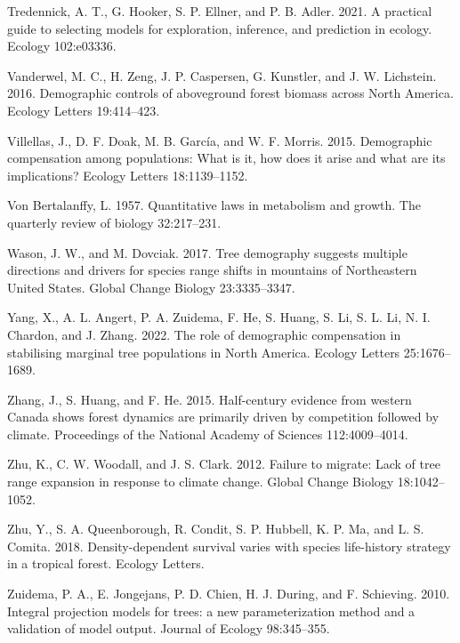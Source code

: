 \documentclass[12pt]{article}
\newlength{\cslhangindent}
\newenvironment{cslreferences}%
  {\setlength{\parindent}{0pt}%
  \everypar{\setlength{\hangindent}{\cslhangindent}}\ignorespaces}%
  {\par}
\begin{document}
\begin{cslreferences}
\leavevmode\hypertarget{ref-Tredennick2021}{}%
Tredennick, A. T., G. Hooker, S. P. Ellner, and P. B. Adler. 2021. A
practical guide to selecting models for exploration, inference, and
prediction in ecology. Ecology 102:e03336.

\leavevmode\hypertarget{ref-Vanderwel2016a}{}%
Vanderwel, M. C., H. Zeng, J. P. Caspersen, G. Kunstler, and J. W.
Lichstein. 2016. Demographic controls of aboveground forest biomass
across North America. Ecology Letters 19:414--423.

\leavevmode\hypertarget{ref-Villellas2015}{}%
Villellas, J., D. F. Doak, M. B. García, and W. F. Morris. 2015.
Demographic compensation among populations: What is it, how does it
arise and what are its implications? Ecology Letters 18:1139--1152.

\leavevmode\hypertarget{ref-von1957quantitative}{}%
Von Bertalanffy, L. 1957. Quantitative laws in metabolism and growth.
The quarterly review of biology 32:217--231.

\leavevmode\hypertarget{ref-Wason2017}{}%
Wason, J. W., and M. Dovciak. 2017. Tree demography suggests multiple
directions and drivers for species range shifts in mountains of
Northeastern United States. Global Change Biology 23:3335--3347.

\leavevmode\hypertarget{ref-Yang2022}{}%
Yang, X., A. L. Angert, P. A. Zuidema, F. He, S. Huang, S. Li, S. L. Li,
N. I. Chardon, and J. Zhang. 2022. The role of demographic compensation
in stabilising marginal tree populations in North America. Ecology
Letters 25:1676--1689.

\leavevmode\hypertarget{ref-Zhang2015}{}%
Zhang, J., S. Huang, and F. He. 2015. Half-century evidence from western
Canada shows forest dynamics are primarily driven by competition
followed by climate. Proceedings of the National Academy of Sciences
112:4009--4014.

\leavevmode\hypertarget{ref-Zhu2012}{}%
Zhu, K., C. W. Woodall, and J. S. Clark. 2012. Failure to migrate: Lack
of tree range expansion in response to climate change. Global Change
Biology 18:1042--1052.

\leavevmode\hypertarget{ref-Zhu2018}{}%
Zhu, Y., S. A. Queenborough, R. Condit, S. P. Hubbell, K. P. Ma, and L.
S. Comita. 2018. Density-dependent survival varies with species
life-history strategy in a tropical forest. Ecology Letters.

\leavevmode\hypertarget{ref-zuidema2010integral}{}%
Zuidema, P. A., E. Jongejans, P. D. Chien, H. J. During, and F.
Schieving. 2010. Integral projection models for trees: a new
parameterization method and a validation of model output. Journal of
Ecology 98:345--355.
\end{cslreferences}


\newpage
\end{document}
